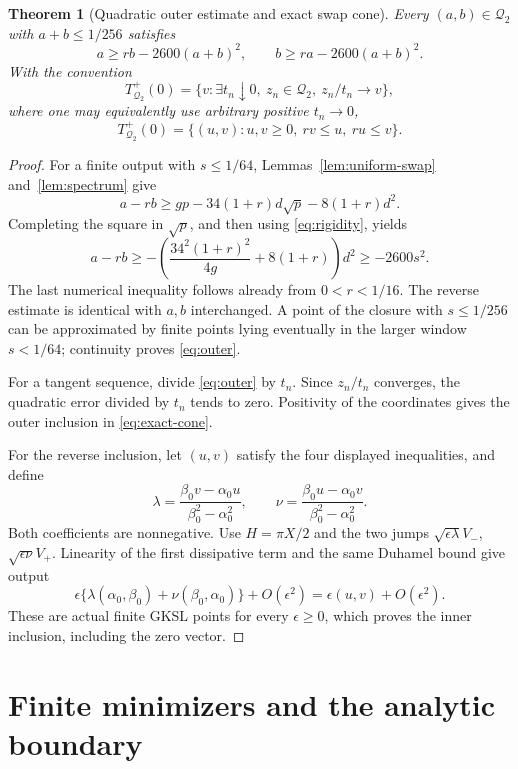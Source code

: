 \documentclass[11pt]{article}
\newtheorem{theorem}{Theorem}[section]
\theoremstyle{definition}
\theoremstyle{remark}
\newcommand{\Q}{\mathcal Q_2}
\begin{document}
\begin{theorem}[Quadratic outer estimate and exact swap cone]\label{thm:swap-cone}
Every \((a,b)\in\Q\) with \(a+b\leq1/256\) satisfies
\begin{equation}\label{eq:outer}
 a\geq rb-2600(a+b)^2,\qquad
 b\geq ra-2600(a+b)^2.
\end{equation}
With the convention
\[
 T^+_{\Q}(0)=\{v:\exists t_n\downarrow0,\ z_n\in\Q,
 \ z_n/t_n\longrightarrow v\},
\]
where one may equivalently use arbitrary positive \(t_n\to0\),
\begin{equation}\label{eq:exact-cone}
 T^+_{\Q}(0)=\{(u,v):u,v\geq0,\ rv\leq u,\ ru\leq v\}.
\end{equation}
\end{theorem}
\begin{proof}
For a finite output with \(s\leq1/64\), Lemmas~\ref{lem:uniform-swap} and~\ref{lem:spectrum} give
\[
 a-rb\geq gp-34(1+r)d\sqrt p-8(1+r)d^2.
\]
Completing the square in \(\sqrt p\), and then using \eqref{eq:rigidity}, yields
\[
 a-rb\geq-\left(\frac{34^2(1+r)^2}{4g}+8(1+r)\right)d^2
 \geq-2600s^2.
\]
The last numerical inequality follows already from \(0<r<1/16\). The reverse estimate is identical with \(a,b\) interchanged. A point of the closure with \(s\leq1/256\) can be approximated by finite points lying eventually in the larger window \(s<1/64\); continuity proves \eqref{eq:outer}.

For a tangent sequence, divide \eqref{eq:outer} by \(t_n\). Since \(z_n/t_n\) converges, the quadratic error divided by \(t_n\) tends to zero. Positivity of the coordinates gives the outer inclusion in \eqref{eq:exact-cone}.

For the reverse inclusion, let \((u,v)\) satisfy the four displayed inequalities, and define
\[
 \lambda=\frac{\beta_0v-\alpha_0u}{\beta_0^2-\alpha_0^2},\qquad
 \nu=\frac{\beta_0u-\alpha_0v}{\beta_0^2-\alpha_0^2}.
\]
Both coefficients are nonnegative. Use \(H=\pi X/2\) and the two jumps
\(\sqrt{\epsilon\lambda}V_-\), \(\sqrt{\epsilon\nu}V_+\). Linearity of the first dissipative term and the same Duhamel bound give output
\[
 \epsilon\{\lambda(\alpha_0,\beta_0)+\nu(\beta_0,\alpha_0)\}+O(\epsilon^2)
 =\epsilon(u,v)+O(\epsilon^2).
\]
These are actual finite GKSL points for every \(\epsilon\geq0\), which proves the inner inclusion, including the zero vector.
\end{proof}

\section{Finite minimizers and the analytic boundary}\label{sec:analytic}
\end{document}
